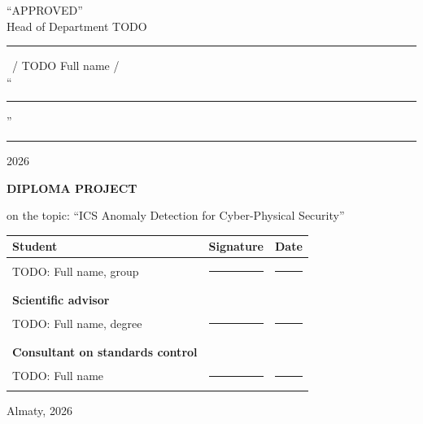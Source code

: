 
\thispagestyle{empty}

\begin{flushright}
``APPROVED'' \\
Head of Department TODO \\
\rule{4cm}{0.4pt}~/ TODO Full name / \\
``\rule{1cm}{0.4pt}'' \rule{2cm}{0.4pt} 2026
\end{flushright}

\vspace{2cm}

\begin{center}
{\Large \textbf{DIPLOMA PROJECT}\par}
\vspace{0.3cm}
{\large on the topic: ``ICS Anomaly Detection for Cyber-Physical Security''\par}
\end{center}

\vspace{2cm}

\noindent
\begin{tabular}{p{6cm}p{4cm}p{4cm}}
\textbf{Student} & \textbf{Signature} & \textbf{Date} \\
\midrule
TODO: Full name, group & \rule{4cm}{0.4pt} & \rule{3cm}{0.4pt} \\
\\
\textbf{Scientific advisor} & & \\
\midrule
TODO: Full name, degree & \rule{4cm}{0.4pt} & \rule{3cm}{0.4pt} \\
\\
\textbf{Consultant on standards control} & & \\
\midrule
TODO: Full name & \rule{4cm}{0.4pt} & \rule{3cm}{0.4pt} \\
\end{tabular}

\vfill

\centering
Almaty, 2026

\newpage
